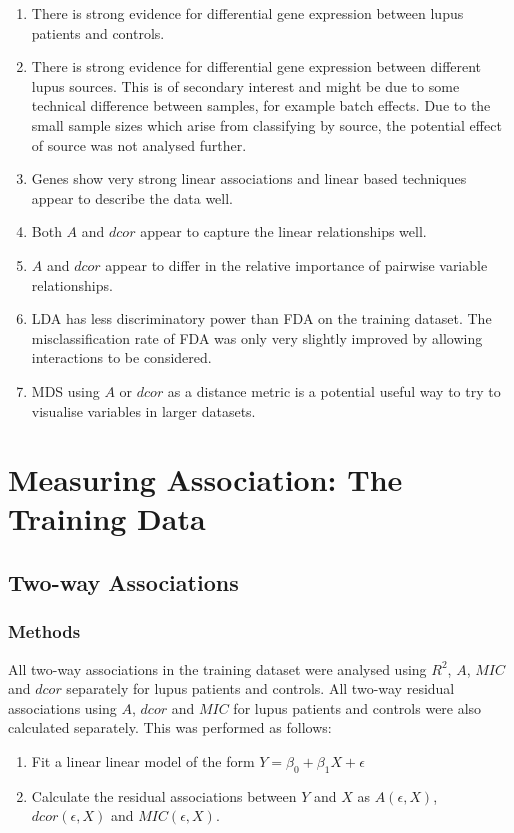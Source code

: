 \documentclass[a4paper, 12pt]{report}
\begin{document}
\begin{enumerate}
\item There is strong evidence for differential gene expression between lupus patients and controls.
\item There is strong evidence for differential gene expression between different lupus sources. This is of secondary interest and might be due to some technical difference between samples, for example batch effects. Due to the small sample sizes which arise from classifying by source, the potential effect of source was not analysed further.

\item Genes show very strong linear associations and linear based techniques appear to describe the data well.
\item Both $A$ and $dcor$ appear to capture the linear relationships well.
\item $A$ and $dcor$ appear to differ in the relative importance of pairwise variable relationships.
\item LDA has less discriminatory power than FDA on the training dataset. The misclassification rate of FDA was only very slightly improved by allowing interactions to be considered.
\item MDS using $A$ or $dcor$ as a distance metric is a potential useful way to try to visualise variables in larger datasets.
\end{enumerate}

\chapter{Measuring Association: The Training Data}

\section{Two-way Associations}

\subsection*{Methods}
All two-way associations in the training dataset were analysed using $R^2$, $A$, $MIC$ and $dcor$ separately for lupus patients and controls. All two-way residual associations using $A$, $dcor$ and $MIC$ for lupus patients and controls were also calculated separately. This was performed as follows:

\begin{enumerate}

\item Fit a linear linear model of the form $Y = \beta_0 + \beta_1X + \epsilon$
\item Calculate the residual associations between $Y$ and $X$ as $A(\epsilon, X)$, $dcor(\epsilon, X)$ and $MIC(\epsilon, X)$.

\end{enumerate}
\end{document}
